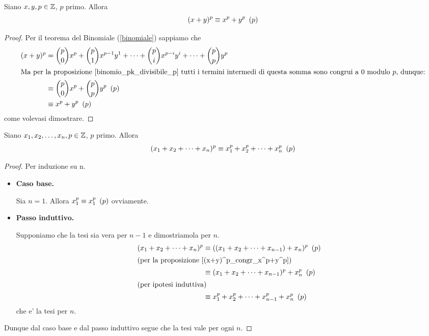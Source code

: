 \begin{proposition}\label{(x+y)^p_congr_x^p+y^p}
    Siano $x, y, p \in \mathbb{Z}$, $p$ primo. Allora
    \begin{equation}
        (x+y)^p \equiv x^p + y^p \ \left(p\right)
    \end{equation}
\end{proposition}
\begin{proof}
    Per il teorema del Binomiale (\ref{binomiale}) sappiamo che
    \begin{alignat*}{1}
        (x+y)^p &= \binom{p}{0}x^p + \binom{p}{1}x^{p-1}y^1 + \dots + \binom{p}{i}x^{p-i}y^i + \dots + \binom{p}{p}y^p \\
        \intertext{Ma per la proposizione \ref{binomio_pk_divisibile_p} tutti i termini intermedi di questa somma sono congrui a $0$ modulo $p$, dunque:}
        &\equiv \binom{p}{0}x^p + \binom{p}{p}y^p \ \left(p\right)\\
        &\equiv x^p + y^p \ \left(p\right)
    \end{alignat*}
    come volevasi dimostrare.
\end{proof}

\begin{corollary}\label{(x_1+x_n)^p_congr_x_1^p+x_n^p}
    Siano $x_1, x_2, \dots, x_n, p \in \mathbb{Z}$, $p$ primo. Allora
    \begin{equation}
        (x_1+x_2+\dots+x_n)^p \equiv x_1^p + x_2^p + \dots + x_n^p \ \left(p\right)
    \end{equation}
\end{corollary}
\begin{proof}
    Per induzione su n.
    \begin{itemize}
        \item \textbf{Caso base.}

        Sia $n = 1$. Allora $x_1^p \equiv x_1^p \ \left(p\right)$ ovviamente.
        \item \textbf{Passo induttivo.}
        
        Supponiamo che la tesi sia vera per $n-1$ e dimostriamola per $n$.
        \begin{alignat*}{1}
            (x_1+x_2+\dots+x_n)^p &\equiv ((x_1+x_2+\dots+x_{n-1})+x_n)^p \ \left(p\right)\\
            \intertext{(per la proposizione \ref{(x+y)^p_congr_x^p+y^p})}
            &\equiv (x_1+x_2+\dots+x_{n-1})^p+x_n^p\ \left(p\right)\\
            \intertext{(per ipotesi induttiva)}
            &\equiv x_1^p + x_2^p + \dots + x_{n-1}^p + x_n^p\ \left(p\right)
        \end{alignat*}
        che e' la tesi per $n$.
    \end{itemize}
    Dunque dal caso base e dal passo induttivo segue che la tesi vale per ogni $n$.
\end{proof}

